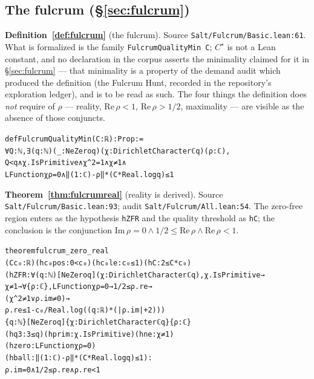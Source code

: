 \documentclass{CUP-JNL-FMP}
\newcommand{\leaninline}[1]{{\small\texttt{#1}}}
\theoremstyle{remark}
\begin{document}
\subsection{The fulcrum (\S\ref{sec:fulcrum})}

\medskip\noindent\textbf{Definition~\ref{def:fulcrum}} (the fulcrum). Source
\leaninline{Salt/Fulcrum/Basic.lean:61}. What is formalized is the family
\leaninline{FulcrumQualityMin C}; $C^\star$ is not a Lean constant, and no
declaration in the corpus asserts the minimality claimed for it in
\S\ref{sec:fulcrum} --- that minimality is a property of the demand audit which
produced the definition (the Fulcrum Hunt, recorded in the repository's
exploration ledger), and is to be read as such. The four things the definition
does \emph{not} require of $\rho$ --- reality, $\mathrm{Re}\,\rho < 1$,
$\mathrm{Re}\,\rho > 1/2$, maximality --- are visible as the absence of those
conjuncts.
{\footnotesize\begin{alltt}
def FulcrumQualityMin (C : ℝ) : Prop :=
  ∀ Q : ℕ, ∃ (q : ℕ) (_ : NeZero q) (χ : DirichletCharacter ℂ q) (ρ : ℂ),
    Q < q ∧ χ.IsPrimitive ∧ χ ^ 2 = 1 ∧ χ ≠ 1 ∧
    LFunction χ ρ = 0 ∧ ‖(1 : ℂ) - ρ‖ * (C * Real.log q) ≤ 1
\end{alltt}}

\medskip\noindent\textbf{Theorem~\ref{thm:fulcrumreal}} (reality is derived).
Source \leaninline{Salt/Fulcrum/Basic.lean:93}; audit
\leaninline{Salt/Fulcrum/All.lean:54}. The zero-free region enters as the
hypothesis \leaninline{hZFR} and the quality threshold as \leaninline{hC}; the
conclusion is the conjunction
$\mathrm{Im}\,\rho = 0 \wedge 1/2 \le \mathrm{Re}\,\rho \wedge
\mathrm{Re}\,\rho < 1$.
{\footnotesize\begin{alltt}
theorem fulcrum_zero_real
    (C c₀ : ℝ) (hc₀pos : 0 < c₀) (hc₀le : c₀ ≤ 1) (hC : 2 ≤ C * c₀)
    (hZFR : ∀ (q : ℕ) [NeZero q] (χ : DirichletCharacter ℂ q), χ.IsPrimitive →
      χ ≠ 1 → ∀ \{ρ : ℂ\}, LFunction χ ρ = 0 → 1 / 2 ≤ ρ.re →
        (χ ^ 2 ≠ 1 ∨ ρ.im ≠ 0) →
        ρ.re ≤ 1 - c₀ / Real.log ((q : ℝ) * (|ρ.im| + 2)))
    \{q : ℕ\} [NeZero q] \{χ : DirichletCharacter ℂ q\} \{ρ : ℂ\}
    (hq3 : 3 ≤ q) (hprim : χ.IsPrimitive) (hne : χ ≠ 1)
    (hzero : LFunction χ ρ = 0)
    (hball : ‖(1 : ℂ) - ρ‖ * (C * Real.log q) ≤ 1) :
    ρ.im = 0 ∧ 1 / 2 ≤ ρ.re ∧ ρ.re < 1
\end{alltt}}
\end{document}

